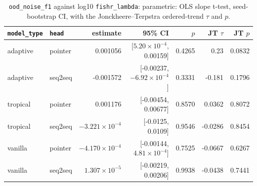 \documentclass[10pt]{article}
\begin{document}
{\small
\begin{longtable}{llrrrrr}
\caption{\texttt{ood\_noise\_f1} against log10 \texttt{fishr\_lambda}: parametric: OLS slope t-test, seed-bootstrap CI, with the Jonckheere--Terpstra ordered-trend $\tau$ and $p$.}\label{tab:trend-ood_noise_f1}\\
\toprule
\texttt{model\_type} & \texttt{head} & estimate & 95\% CI & $p$ & JT $\tau$ & JT $p$\\
\midrule
\endhead
adaptive & pointer & 0.001056 & [$5.20\times10^{-4}$, 0.00159] & 0.4265 & 0.23 & 0.0832\\
adaptive & seq2seq & -0.001572 & [-0.00237, $-6.92\times10^{-4}$] & 0.3331 & -0.181 & 0.1796\\
tropical & pointer & 0.001176 & [-0.00454, 0.00677] & 0.8570 & 0.0362 & 0.8072\\
tropical & seq2seq & $-3.221\times10^{-4}$ & [-0.0125, 0.0109] & 0.9546 & -0.0286 & 0.8454\\
vanilla & pointer & $-4.170\times10^{-4}$ & [-0.00144, $4.81\times10^{-4}$] & 0.7525 & -0.0667 & 0.6267\\
vanilla & seq2seq & $1.307\times10^{-5}$ & [-0.00219, 0.00206] & 0.9938 & -0.0438 & 0.7441\\
\bottomrule
\end{longtable}
}
\end{document}
